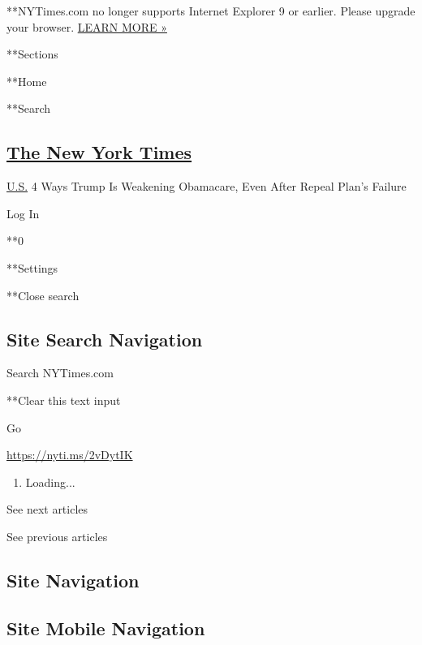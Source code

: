  **NYTimes.com no longer supports Internet Explorer 9 or earlier. Please
upgrade your browser.
\href{http://www.nytimes3xbfgragh.onion/content/help/site/ie9-support.html}{LEARN
MORE »}

**Sections

**Home

**Search

\hypertarget{the-new-york-times}{%
\subsection{\texorpdfstring{\href{http://www.nytimes3xbfgragh.onion/}{The
New York Times}}{The New York Times}}\label{the-new-york-times}}

 \href{https://www.nytimes3xbfgragh.onion/section/us}{U.S.} \textbar{}4
Ways Trump Is Weakening Obamacare, Even After Repeal Plan's Failure

Log In

**0

**Settings

**Close search

\hypertarget{site-search-navigation}{%
\subsection{Site Search Navigation}\label{site-search-navigation}}

Search NYTimes.com

**Clear this text input

Go

\url{https://nyti.ms/2vDytIK}

\begin{enumerate}
\def\labelenumi{\arabic{enumi}.}
\item
  Loading...
\end{enumerate}

See next articles

See previous articles

\hypertarget{site-navigation}{%
\subsection{Site Navigation}\label{site-navigation}}

\hypertarget{site-mobile-navigation}{%
\subsection{Site Mobile Navigation}\label{site-mobile-navigation}}

